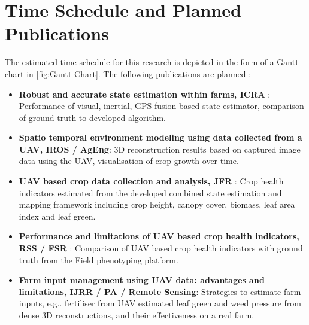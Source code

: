 \section{Time Schedule and Planned Publications}
\label{sec:Time Schedule and Planned Publications}



	The estimated time schedule for this research is depicted in the form of a Gantt chart in \cref{fig:Gantt Chart}. The following publications are planned :-
	\begin{itemize}
		\item \textbf{Robust and accurate state estimation within farms, ICRA} : Performance of visual, inertial, GPS fusion based state estimator, comparison of ground truth to developed algorithm.
		\item \textbf{Spatio temporal environment modeling using data collected from a UAV, IROS / AgEng}: 3D reconstruction results based on captured image data using the UAV, visualisation of crop growth over time.
		\item \textbf{UAV based crop data collection and analysis, JFR} : Crop health indicators estimated from the developed combined state estimation and mapping framework including crop height, canopy cover, biomass, leaf area index and leaf green.
		\item \textbf{Performance and limitations of UAV based crop health indicators, RSS / FSR} : Comparison of UAV based crop health indicators with ground truth from the Field phenotyping platform.
		\item \textbf{Farm input management using UAV data: advantages and limitations, IJRR / PA / Remote Sensing}: Strategies to estimate farm inputs, e.g.. fertiliser from UAV estimated leaf green and weed pressure from dense 3D reconstructions, and their effectiveness on a real farm.
	\end{itemize}

